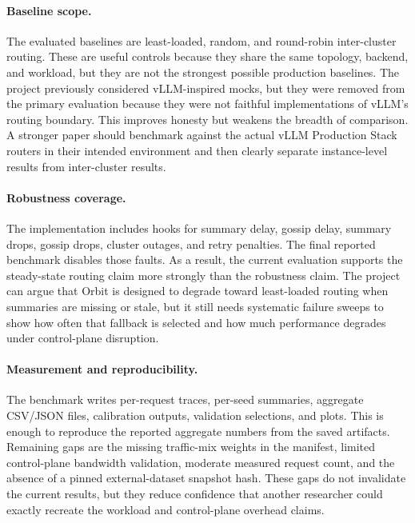 \documentclass[10pt,twocolumn]{article}
\begin{document}
\paragraph{Baseline scope.}
The evaluated baselines are least-loaded, random, and round-robin inter-cluster routing. These are useful controls because they share the same topology, backend, and workload, but they are not the strongest possible production baselines. The project previously considered vLLM-inspired mocks, but they were removed from the primary evaluation because they were not faithful implementations of vLLM's routing boundary. This improves honesty but weakens the breadth of comparison. A stronger paper should benchmark against the actual vLLM Production Stack routers in their intended environment and then clearly separate instance-level results from inter-cluster results.

\paragraph{Robustness coverage.}
The implementation includes hooks for summary delay, gossip delay, summary drops, gossip drops, cluster outages, and retry penalties. The final reported benchmark disables those faults. As a result, the current evaluation supports the steady-state routing claim more strongly than the robustness claim. The project can argue that Orbit is designed to degrade toward least-loaded routing when summaries are missing or stale, but it still needs systematic failure sweeps to show how often that fallback is selected and how much performance degrades under control-plane disruption.

\paragraph{Measurement and reproducibility.}
The benchmark writes per-request traces, per-seed summaries, aggregate CSV/JSON files, calibration outputs, validation selections, and plots. This is enough to reproduce the reported aggregate numbers from the saved artifacts. Remaining gaps are the missing traffic-mix weights in the manifest, limited control-plane bandwidth validation, moderate measured request count, and the absence of a pinned external-dataset snapshot hash. These gaps do not invalidate the current results, but they reduce confidence that another researcher could exactly recreate the workload and control-plane overhead claims.
\end{document}
